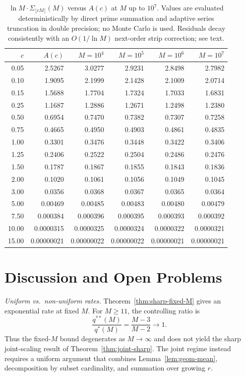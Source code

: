 \documentclass[11pt]{article}
\theoremstyle{remark}
\begin{document}
\begin{table}[!htbp]
\centering
\caption{$\ln M \cdot \Sigma_{\lfloor cM \rfloor}(M)$ versus $A(c)$ at $M$ up to $10^7$. Values are evaluated deterministically by direct prime summation and adaptive series truncation in double precision; no Monte Carlo is used. Residuals decay consistently with an $O(1/\ln M)$ next-order strip correction; see text.}
\label{tab:joint}
\small
\begin{tabular}{rrrrrr}
\toprule
$c$ & $A(c)$ & $M = 10^4$ & $M = 10^5$ & $M = 10^6$ & $M = 10^7$ \\
\midrule
0.05 & 2.5267 & 3.0277 & 2.9231 & 2.8498 & 2.7982 \\
0.10 & 1.9095 & 2.1999 & 2.1428 & 2.1009 & 2.0714 \\
0.15 & 1.5688 & 1.7704 & 1.7324 & 1.7033 & 1.6831 \\
0.25 & 1.1687 & 1.2886 & 1.2671 & 1.2498 & 1.2380 \\
0.50 & 0.6954 & 0.7470 & 0.7382 & 0.7307 & 0.7258 \\
0.75 & 0.4665 & 0.4950 & 0.4903 & 0.4861 & 0.4835 \\
1.00 & 0.3301 & 0.3476 & 0.3448 & 0.3422 & 0.3406 \\
1.25 & 0.2406 & 0.2522 & 0.2504 & 0.2486 & 0.2476 \\
1.50 & 0.1787 & 0.1867 & 0.1855 & 0.1843 & 0.1836 \\
2.00 & 0.1020 & 0.1061 & 0.1056 & 0.1049 & 0.1045 \\
3.00 & 0.0356 & 0.0368 & 0.0367 & 0.0365 & 0.0364 \\
5.00 & 0.00469 & 0.00485 & 0.00483 & 0.00480 & 0.00479 \\
7.50 & 0.000384 & 0.000396 & 0.000395 & 0.000393 & 0.000392 \\
10.00 & 0.0000315 & 0.0000325 & 0.0000324 & 0.0000322 & 0.0000321 \\
15.00 & 0.00000021 & 0.00000022 & 0.00000022 & 0.00000021 & 0.00000021 \\
\bottomrule
\end{tabular}
\end{table}

\section{Discussion and Open Problems}\label{sec:discussion}

\emph{Uniform vs.\ non-uniform rates.} Theorem~\ref{thm:sharp-fixed-M} gives an exponential rate at fixed $M$. For $M \geq 11$, the controlling ratio is
\[
\frac{q^{**}(M)}{q^{*}(M)} = \frac{M-3}{M-2} \longrightarrow 1.
\]
Thus the fixed-$M$ bound degenerates as $M \to \infty$ and does not yield the sharp joint-scaling result of Theorem~\ref{thm:joint-sharp}. The joint regime instead requires a uniform argument that combines Lemma~\ref{lem:geom-mean}, decomposition by subset cardinality, and summation over growing $r$.
\end{document}
